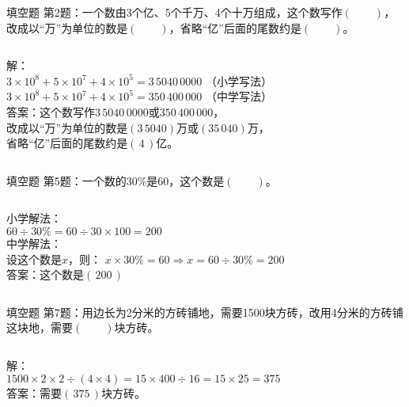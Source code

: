 \documentclass[aspectratio=169]{ctexbeamer} %
\date{\today}
\begin{document}
\begin{frame}[t]{填空题}
第2题：一个数由3个亿、5个千万、4个十万组成，这个数写作$(\qquad)$，改成以“万”为单位的数是$(\qquad)$，省略“亿”后面的尾数约是$(\qquad)$。
\pause
\vspace{1em}
\begin{columns}
解：\\
$3 \times 10^8 + 5 \times 10^7 + 4 \times 10^5 = 3 \, 5040\, 0000 $ （小学写法）\\
$3 \times 10^8 + 5 \times 10^7 + 4 \times 10^5 = 350 \, 400 \, 000 $ （中学写法）\\
\vspace{1em}
答案：这个数写作\alert{$3 \, 5040\, 0000$}或\alert{$350 \, 400 \, 000$}，\\
改成以“万”为单位的数是\alert{$(3 \, 5040)$万}或\alert{$(35 \, 040)$万}， \\
省略“亿”后面的尾数约是\alert{$(\, 4\, )$亿}。
\end{columns}
\end{frame}

\begin{frame}[t]{填空题}
第5题：一个数的30\%是60，这个数是$(\qquad)$。
\pause
\vspace{1em}
\begin{columns}
小学解法：\\
$60 \div 30\% = 60 \div 30 \times 100 = 200$ \\
\vspace{1em}
中学解法： \\
设这个数是$x$，则：
$x \times 30\% = 60 \Rightarrow x = 60 \div 30\% = 200$\\
\vspace{1em}
答案：这个数是\alert{$( \, 200 \, )$}
\end{columns}
\end{frame}

\begin{frame}[t]{填空题}
第7题：用边长为2分米的方砖铺地，需要1500块方砖，改用4分米的方砖铺这块地，需要$(\qquad)$块方砖。
\pause
\vspace{1em}
\begin{columns}
解：\\
$1500 \times  2 \times 2 \div (4 \times 4) = 15 \times 400 \div 16 = 15 \times 25 = 375$ \\
\vspace{1em}
答案：需要\alert{$( \, 375 \, )$}块方砖。
\end{columns}
\end{frame}
\end{document}
